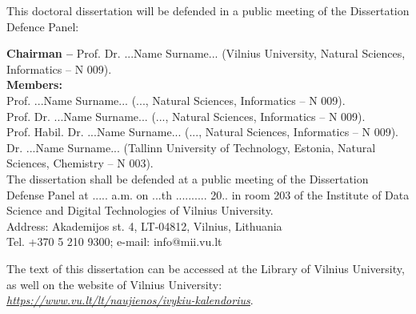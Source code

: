 \vspace{1cm}
\noindent
This doctoral dissertation will be defended in a public meeting of the Dissertation Defence Panel:

\vspace{0.5cm}
\noindent
{\bf Chairman  --} {{Prof. Dr. ...Name Surname...} (Vilnius University, Natural Sciences, Informatics -- N 009)}.\\ %
{\bf Members:}\\ %
{Prof. ...Name Surname...}
(..., Natural Sciences, Informatics -- N 009).\\%
{Prof. Dr. ...Name Surname...}
(..., Natural Sciences, Informatics -- N 009).\\
{Prof. Habil. Dr. ...Name Surname...} 
(..., Natural Sciences, Informatics -- N 009).\\
{Dr. ...Name Surname...}
(Tallinn University of Technology, Estonia, Natural Sciences, Chemistry -- N 003).\\

\vspace{2cm}
\noindent 
The dissertation shall be defended at a public meeting of the Dissertation Defense Panel at ..... a.m. on ...th .......... 20.. in room 203 of the Institute of Data Science and Digital Technologies of Vilnius University. \\
Address: Akademijos st. 4, LT-04812, Vilnius, Lithuania \\
Tel. +370 5 210 9300; e-mail: info@mii.vu.lt

\vspace{1cm}
\noindent
The text of this dissertation can be accessed at the Library of Vilnius
University, as well on the website of Vilnius University: \\ 
\href{https://www.vu.lt/lt/naujienos/ivykiu-kalendorius}{ \textit{\underline{https://www.vu.lt/lt/naujienos/ivykiu-kalendorius}}}.


